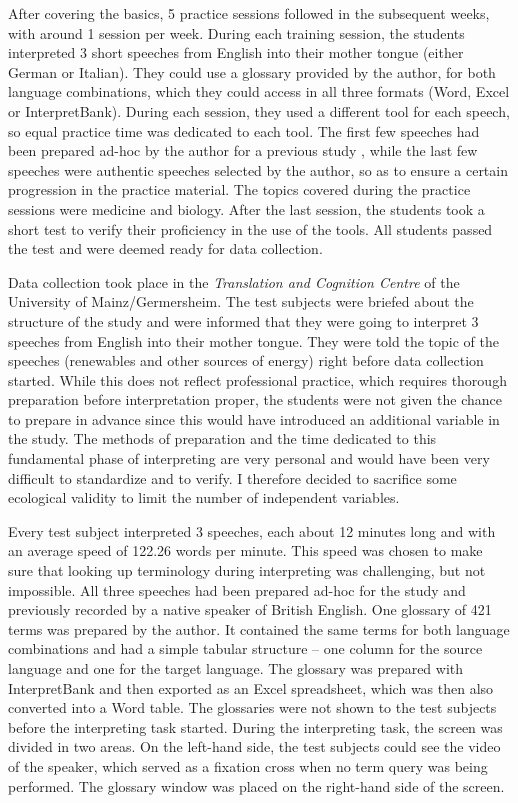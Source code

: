 \documentclass[output=paper]{langsci/langscibook}
\begin{document}
After covering the basics, 5 practice sessions followed in the subsequent weeks, with around 1 session per week. During each training session, the students interpreted 3 short speeches from English into their mother tongue (either German or Italian). They could use a glossary provided by the author, for both language combinations, which they could access in all three formats (Word, Excel or InterpretBank). During each session, they used a different tool for each speech, so equal practice time was dedicated to each tool. The first few speeches had been prepared ad-hoc by the author for a previous study \citep{Prandi2015a, Prandi2015b}, while the last few speeches were authentic speeches selected by the author, so as to ensure a certain progression in the practice material. The topics covered during the practice sessions were medicine and biology. After the last session, the students took a short test to verify their proficiency in the use of the tools. All students passed the test and were deemed ready for data collection.

Data collection took place in the \textit{Translation and Cognition Centre} of the University of Mainz\slash Germersheim. The test subjects were briefed about the structure of the study and were informed that they were going to interpret 3 speeches from English into their mother tongue. They were told the topic of the speeches (renewables and other sources of energy) right before data collection started. While this does not reflect professional practice, which requires thorough preparation before interpretation proper, the students were not given the chance to prepare in advance since this would have introduced an additional variable in the study. The methods of preparation and the time dedicated to this fundamental phase of interpreting are very personal and would have been very difficult to standardize and to verify. I therefore decided to sacrifice some ecological validity to limit the number of independent variables.

Every test subject interpreted 3 speeches, each about 12 minutes long and with an average speed of 122.26 words per minute. This speed was chosen to make sure that looking up terminology during interpreting was challenging, but not impossible. All three speeches had been prepared ad-hoc for the study and previously recorded by a native speaker of British English. One glossary of 421 terms was prepared by the author. It contained the same terms for both language combinations and had a simple tabular structure – one column for the source language and one for the target language. The glossary was prepared with InterpretBank and then exported as an Excel spreadsheet, which was then also converted into a Word table. The glossaries were not shown to the test subjects before the interpreting task started. During the interpreting task, the screen was divided in two areas. On the left-hand side, the test subjects could see the video of the speaker, which served as a fixation cross when no term query was being performed. The glossary window was placed on the right-hand side of the screen.
\end{document}
